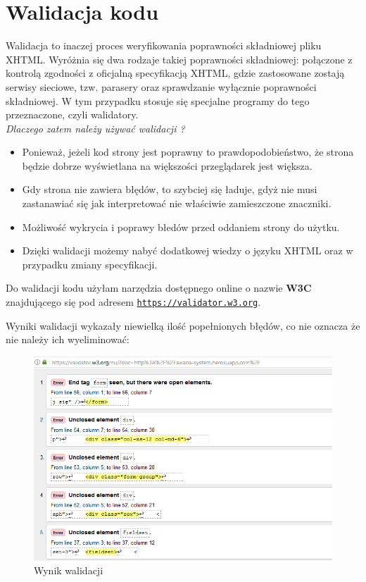 \documentclass[openright]{xmgr}
\begin{document}
	
	\chapter{Walidacja kodu}
	
	Walidacja to inaczej proces weryfikowania poprawności składniowej pliku XHTML. Wyróżnia się dwa rodzaje takiej poprawności składniowej: połączone z kontrolą zgodności z oficjalną specyfikacją XHTML, gdzie zastosowane zostają serwisy sieciowe, tzw. parasery oraz sprawdzanie wyłącznie poprawności składniowej. W tym przypadku stosuje się specjalne programy do tego przeznaczone, czyli walidatory.\\
	
	\textit{Dlaczego zatem należy używać walidacji ?}
		\begin{itemize}
			\item Ponieważ, jeżeli kod strony jest poprawny to prawdopodobieństwo, że strona będzie dobrze wyświetlana na większości przeglądarek jest większa.
			\item Gdy strona nie zawiera błędów, to szybciej się ładuje, gdyż nie musi zastanawiać się jak interpretować nie właściwie zamieszczone znaczniki.
			\item Możliwość wykrycia i poprawy błedów przed oddaniem strony do użytku.
			\item Dzięki walidacji możemy nabyć dodatkowej wiedzy o języku XHTML oraz w przypadku zmiany specyfikacji.
		\end{itemize}
		
		Do walidacji kodu użyłam narzędzia dostępnego online o nazwie \textbf{W3C} znajdującego się pod adresem \texttt{\url{https://validator.w3.org}}.
	
	Wyniki walidacji wykazały niewielką ilość popełnionych błędów, co nie oznacza że nie należy ich wyeliminować:
	
	\begin{figure}[!tbh]
		\centering
		\includegraphics[width=\linewidth]{image/walidacja}
		\caption{Wynik walidacji}
	\end{figure}
	
\end{document}
